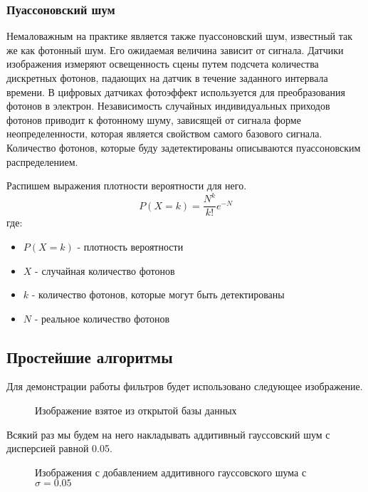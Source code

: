 \subsubsection{Пуассоновский шум}
Немаловажным на практике является также пуассоновский шум, известный так же как фотонный шум. Его ожидаемая величина зависит от сигнала.
Датчики изображения измеряют освещенность сцены путем подсчета количества дискретных фотонов, падающих на датчик в течение заданного интервала времени. В цифровых датчиках фотоэффект используется для преобразования фотонов в электрон. Независимость случайных индивидуальных приходов фотонов приводит к фотонному шуму, зависящей от сигнала форме неопределенности, которая является свойством самого базового сигнала\cite{poisson}.  Количество фотонов, которые буду задетектированы описываются пуассоновским распределением.


 Распишем выражения плотности вероятности для него.
\begin{equation}
	P(X=k)=\frac{N^k}{k!}e^{-N}
\end{equation}
где:
\begin{itemize}
	\item $P(X=k)$ - плотность вероятности
	\item $X$ - случайная количество фотонов
	\item $k$ - количество фотонов, которые могут быть детектированы 
	\item $N$ - реальное количество фотонов
\end{itemize}

\subsection{Простейшие алгоритмы}
Для демонстрации работы фильтров будет использовано следующее изображение.
\begin{figure}[H]\label{img:orig}
	\caption{Изображение взятое из открытой базы данных \cite{imageNet}}
\end{figure}

Всякий раз  мы будем на него накладывать аддитивный гауссовский шум с дисперсией равной  0.05.
\begin{figure}[H]\label{img:noised}
	\caption{Изображения с добавлением аддитивного гауссовского шума с $\sigma=0.05$}
\end{figure}
